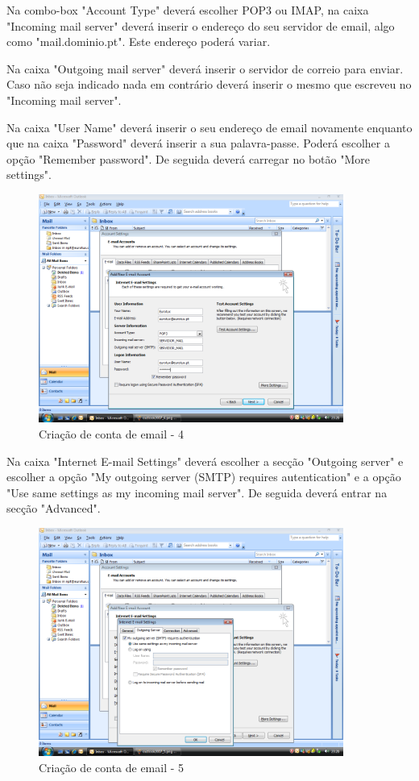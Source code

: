 Na combo-box "Account Type" deverá escolher POP3 ou IMAP, na caixa "Incoming mail server" deverá inserir o endereço do seu servidor de email, algo como "mail.dominio.pt". Este endereço poderá variar.

Na caixa "Outgoing mail server" deverá inserir o servidor de correio para enviar. Caso não seja indicado nada em contrário deverá inserir o mesmo que escreveu no "Incoming mail server".

Na caixa "User Name" deverá inserir o seu endereço de email novamente enquanto que na caixa "Password" deverá inserir a sua palavra-passe. Poderá escolher a opção "Remember password". De seguida deverá carregar no botão "More settings".

\begin{figure}[H]
    \begin{center}
        \includegraphics[width=10cm]{include/img/outlook2007_5}
    \end{center}
    \caption{Criação de conta de email - 4}
    \label{fig:OUTLK2k75}
\end{figure}

Na caixa "Internet E-mail Settings" deverá escolher a secção "Outgoing server" e escolher a opção "My outgoing server (SMTP) requires autentication" e a opção "Use same settings as my incoming mail server". De seguida deverá entrar na secção "Advanced".

\begin{figure}[H]
    \begin{center}
        \includegraphics[width=10cm]{include/img/outlook2007_6}
    \end{center}
    \caption{Criação de conta de email - 5}
    \label{fig:OUTLK2k76}
\end{figure}

